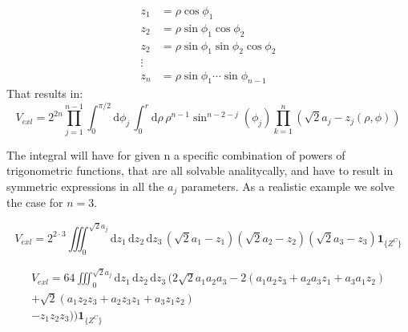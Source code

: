 \documentclass[superscriptaddress,pre,reprint,showpacs,onecolumn]{revtex4-1}
\newcommand{\rd}[1]{\mathrm{d}{#1} \,}
\newcommand{\indicatorsymbol}{\mathbf{1}}
\newcommand{\indicator}[1]{\indicatorsymbol_{ \{   #1 \} } }
\begin{document}
\begin{equation}
  \begin{split}
    z_1 & =\rho \cos \phi_1 \\
    z_2 & =\rho \sin \phi_1 \cos \phi_2 \\
     z_2 & =\rho \sin \phi_1 \sin \phi_2 \cos \phi_2 \\
    \vdots & \\
    z_n & = \rho \sin \phi_1 \cdots \sin \phi_{n-1}
  \end{split}
\end{equation}
That results in:
\begin{equation}
  V_{exl}=2^{2n} \prod_{j=1}^{n-1} \int_0^{\pi/2} \rd{\phi_j}
  \int_0^r \rd{\rho} \rho^{n-1} \sin^{n-2-j}(\phi_j)
  \prod_{k=1}^n (\sqrt{2}a_j -z_j(\rho, \phi)) 
\end{equation}

The integral will have for given n a specific combination of powers
of trigonometric functions, that are all solvable analitycally, and have
to result in symmetric expressions in all the $a_j$ parameters. As
a realistic example we solve the case for $n=3$.

\begin{equation}
  V_{exl}=2^{2\cdot 3} \iiint_0^ {\sqrt{2} a_j} \rd{z_1} \rd{z_2}  \rd{z_3} 
  (\sqrt{2}a_1 -z_1)(\sqrt{2}a_2 -z_2)(\sqrt{2}a_3-z_3) \indicator{Z^C}
\end{equation}

\begin{multline}
  V_{exl} = 64 \iiint_0^ {\sqrt{2} a_j} \rd{z_1} \rd{z_2}  \rd{z_3} 
  \bigg( 2\sqrt{2}a_1 a_2 a_3
  -2(a_1 a_2 z_3 +a_2 a_3 z_1 +a_3 a_1 z_2) \\
   +\sqrt{2}(a_1 z_2 z_3+a_2 z_3 z_1+a_3 z_1 z_2)\\
   -z_1 z _2 z_3 )
  \bigg) \indicator{Z^C}
\end{multline}
\end{document}
